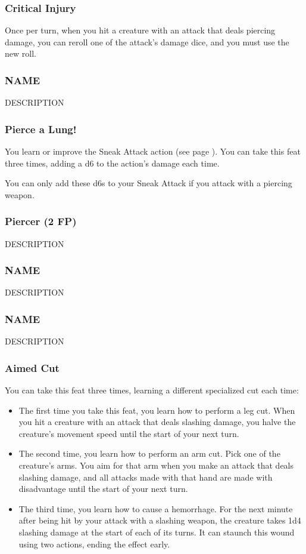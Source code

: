 \subsubsection{Critical Injury} \label{feat::criticalinjury}
    Once per turn, when you hit a creature with an attack that deals piercing damage, you can reroll one of the attack's damage dice, and you must use the new roll.
\subsubsection{NAME} \label{feat::name}
    DESCRIPTION
\subsubsection{Pierce a Lung!} \label{feat::piercealung}
    You learn or improve the Sneak Attack action (see page \pageref{act:sneakattack}).
    You can take this feat three times, adding a d6 to the action's damage each time.

    You can only add these d6s to your Sneak Attack if you attack with a piercing weapon.
\subsubsection{Piercer (2 FP)} \label{feat::piercer}
    DESCRIPTION
\subsubsection{NAME} \label{feat::name}
    DESCRIPTION
\subsubsection{NAME} \label{feat::name}
    DESCRIPTION
\subsubsection{Aimed Cut} \label{feat::aimedcut}
    You can take this feat three times, learning a different specialized cut each time:
    \begin{itemize}
        \item The first time you take this feat, you learn how to perform a leg cut.
        When you hit a creature with an attack that deals slashing damage, you halve the creature's movement speed until the start of your next turn.
        \item The second time, you learn how to perform an arm cut.
        Pick one of the creature's arms.
        You aim for that arm when you make an attack that deals slashing damage, and all attacks made with that hand are made with disadvantage until the start of your next turn.
        \item The third time, you learn how to cause a hemorrhage.
        For the next minute after being hit by your attack with a slashing weapon, the creature takes 1d4 slashing damage at the start of each of its turns.
        It can staunch this wound using two actions, ending the effect early.
    \end{itemize}

